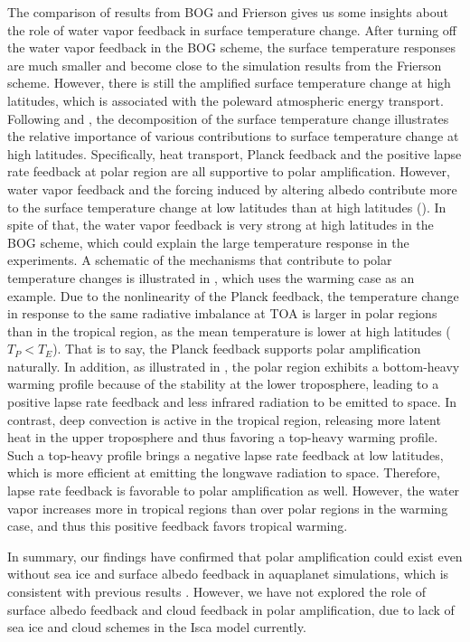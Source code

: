 The comparison of results from BOG and Frierson gives us some insights about the role of water vapor feedback in surface temperature change. After turning off the water vapor feedback in the BOG scheme, the surface temperature responses are much smaller and become close to the simulation results from the Frierson scheme. However, there is still the amplified surface temperature change at high latitudes, which is associated with the poleward atmospheric energy transport. Following \cite{Feldl2013} and \cite{Kim2018}, the decomposition of the surface temperature change illustrates the relative importance of various contributions to surface temperature change at high latitudes. Specifically, heat transport, Planck feedback and the positive lapse rate feedback at polar region are all supportive to polar amplification. However, water vapor feedback and the forcing induced by altering albedo contribute more to the surface temperature change at low latitudes than at high latitudes (). In spite of that, the water vapor feedback is very strong at high latitudes in the BOG scheme, which could explain the large temperature response in the experiments. A schematic of the mechanisms that contribute to polar temperature changes is illustrated in , which uses the warming case as an example. Due to the nonlinearity of the Planck feedback, the temperature change in response to the same radiative imbalance at TOA is larger in polar regions than in the tropical region, as the mean temperature is lower at high latitudes ($T_P<T_E$). That is to say, the Planck feedback supports polar amplification naturally. In addition, as illustrated in , the polar region exhibits a bottom-heavy warming profile because of the stability at the lower troposphere, leading to a positive lapse rate feedback and less infrared radiation to be emitted to space. In contrast, deep convection is active in the tropical region, releasing more latent heat in the upper troposphere and thus favoring a top-heavy warming profile. Such a top-heavy profile brings a negative lapse rate feedback at low latitudes, which is more efficient at emitting the longwave radiation to space. Therefore, lapse rate feedback is favorable to polar amplification as well. However, the water vapor increases more in tropical regions than over polar regions in the warming case, and thus this positive feedback favors tropical warming.

In summary, our findings have confirmed that polar amplification could exist even without sea ice and surface albedo feedback in aquaplanet simulations, which is consistent with previous results \citep{Langen2007,Kim2018,Alexeev2005}. However, we have not explored the role of surface albedo feedback and cloud feedback in polar amplification, due to lack of sea ice and cloud schemes in the Isca model currently.

